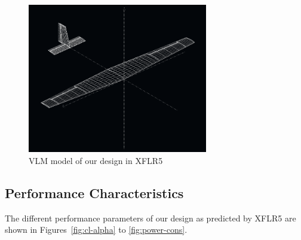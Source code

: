 \documentclass[11pt]{article}
\begin{document}
    \begin{figure}[h!]
    	\centering
    	\includegraphics[width=0.7\textwidth]{Figures/PS3/SkynetV3_XFLR_pic.png}
    	\caption{VLM model of our design in XFLR5}\label{fig:vlm-design}
    \end{figure}

    \subsection{Performance Characteristics}
    \label{PerfChar}

    The different performance parameters of our design as predicted by XFLR5 are shown in Figures~\ref{fig:cl-alpha} to \ref{fig:power-cons}.
\end{document}
